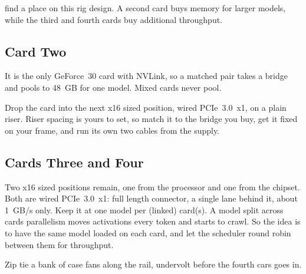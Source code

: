  find a place on this rig
design\cite{gigabyteB650EagleAX}. A second card
buys memory for larger models, while the third and fourth cards buy additional throughput.

\subsection{Card Two}


 It is the only GeForce~30 card
with NVLink, so a matched pair takes a bridge and pools to 48~GB for one model. 
Mixed cards never pool.

 Drop the card into the next x16 sized
position, wired PCIe~3.0~x1, on a plain riser. 
Riser spacing is yours to set, so match it to
the bridge you buy, get it fixed on your frame, and run its own two cables from the supply.

\subsection{Cards Three and Four}

 Two x16 sized positions remain, one
from the processor and one from the chipset. Both are wired PCIe~3.0~x1: full length
connector, a single lane behind it, about 1~GB/s only.
Keep it at one model per (linked) card(s). A model split across cards
parallelism moves activations every token and starts to crawl. So the idea is to have the same model loaded
    on each card, and let the scheduler round robin between them for throughput.


 Zip tie a bank of case
fans along the rail, undervolt before the fourth cars goes in.



